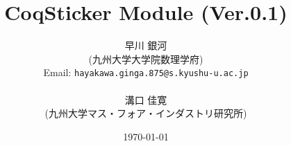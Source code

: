 \documentclass{jreport}
\begin{document}
\title{CoqSticker Module (Ver.0.1)}
\author{早川 銀河 \\ (九州大学大学院数理学府)\\
Email: {\tt hayakawa.ginga.875@s.kyushu-u.ac.jp}\\
\ \\
溝口 佳寛 \\ (九州大学マス・フォア・インダストリ研究所)}
\date{\today}

\maketitle

\tableofcontents

  
  
  
  
  
\end{document}
